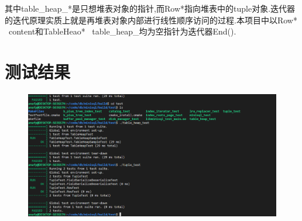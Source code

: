 \documentclass{article}
\begin{document}
\indent 其中table\_heap\_*是只想堆表对象的指针,而Row*指向堆表中的tuple对象.迭代器的迭代原理实质上就是再堆表对象内部进行线性顺序访问的过程.本项目中以Row* \ content和TableHeao* \ table\_heap\_均为空指针为迭代器End().


\section[4]{测试结果}
\begin{figure}

    \includegraphics{picture/屏幕截图 2022-05-29 185052.png}
\end{figure}
\end{document}
